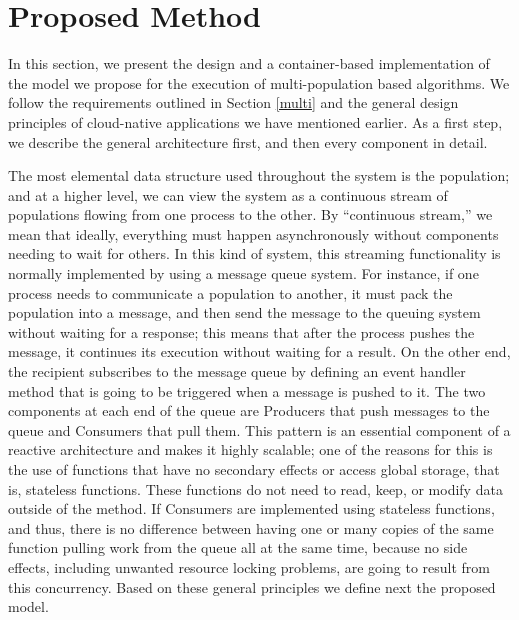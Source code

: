 \documentclass[review]{elsarticle}
\begin{document}
\section{Proposed Method} 
\label{method} 

In this section, we present the design
and a container-based implementation of the model we propose for the execution
of multi-population based algorithms. We follow the requirements outlined in
Section \ref{multi} and the general design principles of cloud-native
applications we have mentioned earlier. As a first step, we describe the general
architecture first, and then  every component in detail. 

The most elemental data structure used throughout the system is the population; and at a higher
level, we can view the system as a continuous stream of populations
flowing from one process to the other. By ``continuous stream,'' we mean that ideally,
everything must happen asynchronously without components needing to wait for
others. In this kind of system, this streaming functionality is normally
implemented by using a message queue system. For instance, if one process needs
to communicate a population to another, it must pack the population into
a message, and then send the message 
to the queuing system without waiting for a response; this
means that after the process pushes the message, it continues its execution
without waiting for a result. On the other end, the recipient subscribes to the
message queue by defining an event handler method that is going to be triggered when a
message is pushed to it. The two components at each end of the queue are
Producers that push messages to the queue and Consumers that pull them. This
pattern is an essential component of a reactive architecture and makes
it 
highly scalable; one of the reasons for this is the use of functions
that have no secondary effects or access global storage, that is,
stateless functions. These functions do not need to read, keep, or modify data outside of the method. If
Consumers are implemented using stateless functions, and thus, there is no difference
between having one or many copies of the same function pulling work from the queue all at the
same time, because no side effects, including unwanted resource
locking problems,  are going to result from this concurrency.
Based on these general principles we define next the proposed model.
\end{document}
